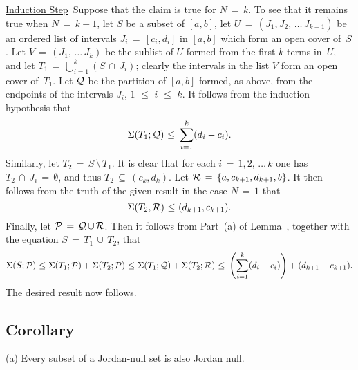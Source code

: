         \underline{Induction Step}\, Suppose that the claim is true for $N \,=\, k$. To see that it remains true when $N \,=\, k+1$, let $S$ be a subset of $[a,b]$,
    let $U \,=\, (J_{1}, J_{2},\,{\ldots}\,J_{k+1})$ be an ordered list of intervals $J_{i} \,=\, [c_{i},d_{i}]$ in $[a,b]$ which form an open cover of~$S$.
    Let $V \,=\, (J_{1},\,{\ldots}\,J_{k})$ be the sublist of $U$ formed from the first $k$ terms in~$U$, and let $T_{1} \,=\, {\bigcup}_{i=1}^{k} (S\,{\cap}\,J_{i})$;
    clearly the intervals in the list $V$ form an open cover of~$T_{1}$. Let ${\cal Q}$ be the partition of $[a,b]$ formed, as above, from the endpoints of the intervals $J_{i}$, $1\,\,{\leq}\,\,i\,\,{\leq}\,\,k$.
    It follows from the induction hypothesis that
        \begin{displaymath}
        {\Sigma}(T_{1};{\cal Q})\,\,{\leq}\,\,\sum_{i=1}^{k} (d_{i}-c_{i}).
        \end{displaymath}
    Similarly, let $T_{2} \,=\, S\,{\setminus}\,T_{1}$. It is clear that for each $i \,=\, 1,2,\,{\ldots}\,k$ one has
    $T_{2}\,{\cap}\,J_{i} \,=\, {\emptyset}$, and thus $T_{2} \,{\subseteq}\, (c_{k},d_{k})$. Let ${\cal R} \,=\, \{a,c_{k+1}, d_{k+1},b\}$.
    It then follows from the truth of the given result in the case $N \,=\, 1$ that
        \begin{displaymath}
        {\Sigma}(T_{2},{\cal R})\,\,{\leq}\,\,(d_{k+1},c_{k+1}).
        \end{displaymath}
    Finally, let ${\cal P} \,=\, {\cal Q}\,{\cup}\,{\cal R}$. Then it follows from Part~(a) of Lemma~, together with the equation $S \,=\, T_{1}\,{\cup}\,T_{2}$, that
        \begin{displaymath}
        {\Sigma}(S;{\cal P})\,\,{\leq}\,\,{\Sigma}(T_{1};{\cal P}) + {\Sigma}(T_{2};{\cal P})
    \,\,{\leq}\,\,
        {\Sigma}(T_{1}; {\cal Q}) + {\Sigma}(T_{2};{\cal R})
    \,\,{\leq}\,\,
        \left(\sum_{i=1}^{k} (d_{i}-c_{i})\right) + (d_{k+1}-c_{k+1}).
        \end{displaymath}
    The desired result now follows. \Q

\V

        \subsection{\small{{\bf Corollary}}}
        \label{CorH20.55BC}

\V

\hspace*{\parindent}(a)   Every subset of a Jordan-null set is also Jordan null.

